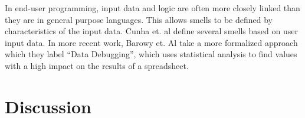 \documentclass[10pt,conference,compsocconf]{IEEEtran}
\begin{document}
In end-user programming, input data and logic are often more closely linked than they are in general purpose languages.
This allows smells to be defined by characteristics of the input data.
Cunha et. al \cite{cunha2012towards} define several smells based on user input data.
In more recent work, Barowy et. Al \cite{barowy2014checkcell} take a  more formalized approach which they label ``Data Debugging'', which uses statistical analysis to find values with a high impact on the results of a spreadsheet.

%
%
%

\section{Discussion}
\label{sec:discussion}
\end{document}
